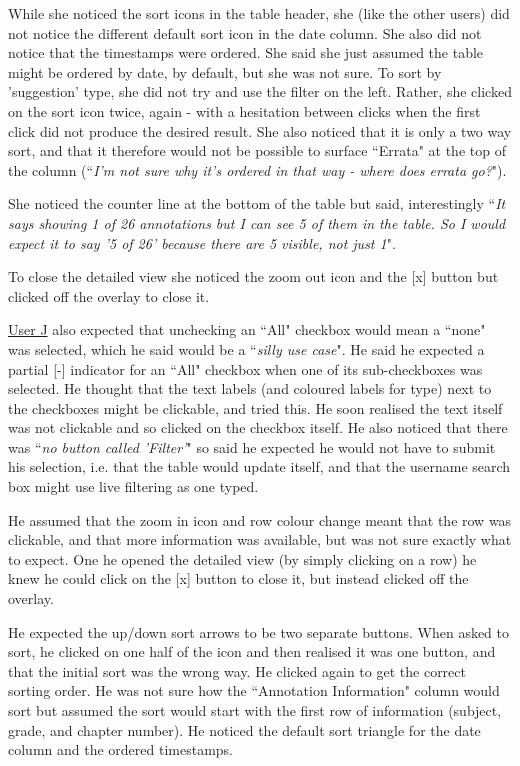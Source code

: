While she noticed the sort icons in the table header, she (like the other users) did not notice the different default sort icon in the date column. She also did not notice that the timestamps were ordered. She said she just assumed the table might be ordered by date, by default, but she was not sure. To sort by 'suggestion' type, she did not try and use the filter on the left. Rather, she clicked on the sort icon twice, again - with a hesitation between clicks when the first click did not produce the desired result. She also noticed that it is only a two way sort, and that it therefore would not be possible to surface ``Errata" at the top of the column (``\textit{I'm not sure why it's ordered in that way - where does errata go?}").

She noticed the counter line at the bottom of the table but said, interestingly ``\textit{It says showing 1 of 26 annotations but I can see 5 of them in the table. So I would expect it to say '5 of 26' because there are 5 visible, not just 1}". 

To close the detailed view she noticed the zoom out icon and the [x] button but clicked off  the overlay to close it. 

\underline{User J} also expected that unchecking an ``All" checkbox would mean a ``none" was selected, which he said would be a ``\textit{silly use case}". He said he expected a partial [-] indicator for an ``All" checkbox when one of its sub-checkboxes was selected. He thought that the text labels (and coloured labels for type) next to the checkboxes might be clickable, and tried this. He soon realised the text itself was not clickable and so clicked on the checkbox itself. He also noticed  that there was ``\textit{no button called 'Filter'}" so said he expected he would not have to submit his selection, i.e. that the table would update itself, and that the username search box might use live filtering as one typed. 

He assumed that the zoom in icon and row colour change meant that the row was clickable, and that more information was available, but was not sure exactly what to expect. One he opened the detailed view (by simply clicking on a row) he knew he could click on the [x] button to close it, but instead clicked off the overlay. 

He expected the up/down sort arrows to be two separate buttons. When asked to sort, he clicked on one half of the icon and then realised it was one button, and that the initial sort was the wrong way. He clicked again to get the correct sorting order. He was not sure how the ``Annotation Information" column would sort but assumed the sort would start with the first row of information (subject, grade, and chapter number). He noticed the default sort triangle for the date column and  the ordered timestamps. 

